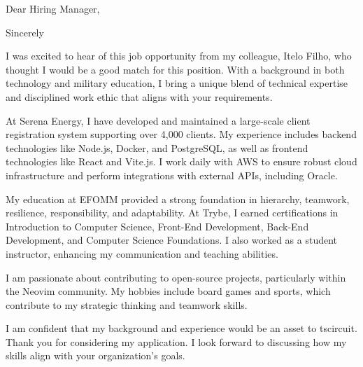 \documentclass[12pt,a4paper,sans]{moderncv}
\begin{document}
\date{25 June 2024}
\opening{Dear Hiring Manager,}
\closing{Sincerely}
\makelettertitle

I was excited to hear of this job opportunity from my colleague,
Itelo Filho, who thought I would be a good match for this position.
With a background in both technology and military education, I bring
a unique blend of technical expertise and disciplined work ethic that
aligns with your requirements.

At Serena Energy, I have developed and maintained a large-scale
client registration system supporting over 4,000 clients. My
experience includes backend technologies like Node.js, Docker, and
PostgreSQL, as well as frontend technologies like React and Vite.js.
I work daily with AWS to ensure robust cloud infrastructure and
perform integrations with external APIs, including Oracle.

My education at EFOMM provided a strong foundation in hierarchy,
teamwork, resilience, responsibility, and adaptability. At Trybe, I
earned certifications in Introduction to Computer Science, Front-End
Development, Back-End Development, and Computer Science Foundations.
I also worked as a student instructor, enhancing my communication and
teaching abilities.

I am passionate about contributing to open-source projects,
particularly within the Neovim community. My hobbies include board
games and sports, which contribute to my strategic thinking and teamwork skills.

I am confident that my background and experience would be an asset to
tscircuit. Thank you for considering my application. I look forward
to discussing how my skills align with your organization's goals.

\makeletterclosing
\end{document}
